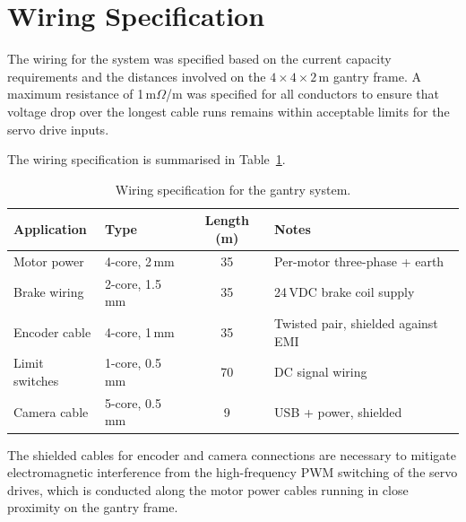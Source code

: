 \section{Wiring Specification}

The wiring for the system was specified based on the current capacity requirements and the distances involved on the $4 \times 4 \times 2$\,m gantry frame. A maximum resistance of 1\,m$\Omega$/m was specified for all conductors to ensure that voltage drop over the longest cable runs remains within acceptable limits for the servo drive inputs.

The wiring specification is summarised in Table~\ref{tab:wiring}.

\begin{table}[H]
    \centering
    \caption{Wiring specification for the gantry system.}
    \label{tab:wiring}
    \renewcommand{\arraystretch}{1.2}
    \begin{tabular}{@{}llcl@{}}
        \toprule
        \textbf{Application} & \textbf{Type} & \textbf{Length (m)} & \textbf{Notes} \\
        \midrule
        Motor power & 4-core, 2\,mm & 35 & Per-motor three-phase + earth \\
        Brake wiring & 2-core, 1.5\,mm & 35 & 24\,VDC brake coil supply \\
        Encoder cable & 4-core, 1\,mm & 35 & Twisted pair, shielded against EMI \\
        Limit switches & 1-core, 0.5\,mm & 70 & DC signal wiring \\
        Camera cable & 5-core, 0.5\,mm & 9 & USB + power, shielded \\
        \bottomrule
    \end{tabular}
\end{table}

The shielded cables for encoder and camera connections are necessary to mitigate electromagnetic interference from the high-frequency PWM switching of the servo drives, which is conducted along the motor power cables running in close proximity on the gantry frame.